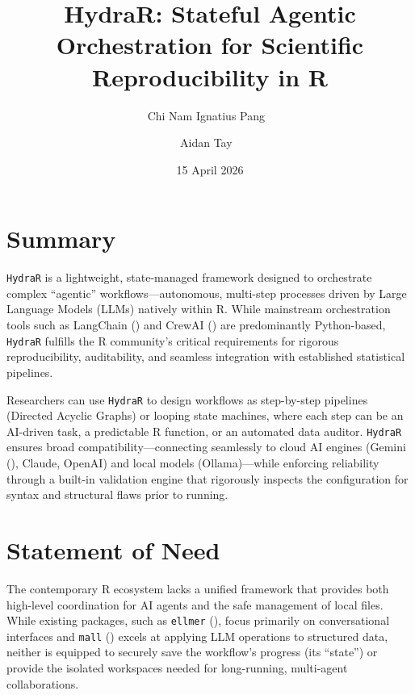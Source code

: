 \documentclass[
]{article}
\title{HydraR: Stateful Agentic Orchestration for Scientific
Reproducibility in R}
\author[1%
  ]{Chi Nam Ignatius Pang%
    \,\orcidlink{0000-0001-9703-5741}\,%
    }
\author[1%
  ]{Aidan Tay%
    \,\orcidlink{0000-0003-1315-4896}\,%
    }
\affil[1]{Australian Proteome Analysis Facility (APAF), Macquarie
University, Sydney, Australia%
  }
\date{15 April 2026}
\begin{document}
\maketitle

\section{Summary}\label{summary}

\texttt{HydraR} is a lightweight, state-managed framework designed to
orchestrate complex ``agentic'' workflows---autonomous, multi-step
processes driven by Large Language Models (LLMs) natively within R.
While mainstream orchestration tools such as LangChain
() and CrewAI
() are predominantly Python-based,
\texttt{HydraR} fulfills the R community's critical requirements for
rigorous reproducibility, auditability, and seamless integration with
established statistical pipelines.

Researchers can use \texttt{HydraR} to design workflows as step-by-step pipelines (Directed Acyclic Graphs) or looping state machines, where each step can be an AI-driven task, a predictable R function, or an automated data auditor. \texttt{HydraR} ensures broad compatibility---connecting seamlessly to cloud AI engines (Gemini (), Claude, OpenAI) and local models (Ollama)---while enforcing reliability through a built-in validation engine that rigorously inspects the configuration for syntax and structural flaws prior to running.

\section{Statement of Need}\label{statement-of-need}

The contemporary R ecosystem lacks a unified framework that provides both high-level coordination for AI agents and the safe management of local files. While existing packages, such as \texttt{ellmer} (), focus primarily on conversational interfaces and \texttt{mall} () excels at applying LLM operations to structured data, neither is equipped to securely save the workflow's progress (its ``state'') or provide the isolated workspaces needed for long-running, multi-agent collaborations.
\end{document}
